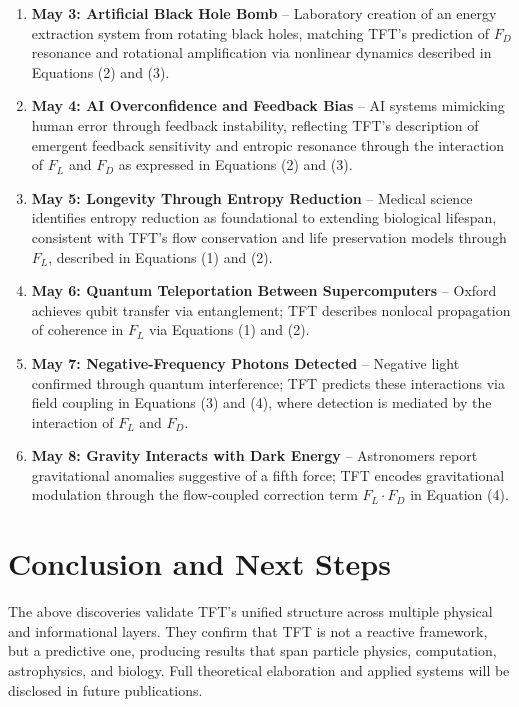 \documentclass[11pt]{article}
\begin{document}
\begin{enumerate}
\item \textbf{May 3: Artificial Black Hole Bomb} – Laboratory creation of an energy extraction system from rotating black holes, matching TFT's prediction of \(F_D\) resonance and rotational amplification via nonlinear dynamics described in Equations (2) and (3).

\item \textbf{May 4: AI Overconfidence and Feedback Bias} – AI systems mimicking human error through feedback instability, reflecting TFT's description of emergent feedback sensitivity and entropic resonance through the interaction of \(F_L\) and \(F_D\) as expressed in Equations (2) and (3).

\item \textbf{May 5: Longevity Through Entropy Reduction} – Medical science identifies entropy reduction as foundational to extending biological lifespan, consistent with TFT's flow conservation and life preservation models through \(F_L\), described in Equations (1) and (2).

\item \textbf{May 6: Quantum Teleportation Between Supercomputers} – Oxford achieves qubit transfer via entanglement; TFT describes nonlocal propagation of coherence in \(F_L\) via Equations (1) and (2).

\item \textbf{May 7: Negative-Frequency Photons Detected} – Negative light confirmed through quantum interference; TFT predicts these interactions via field coupling in Equations (3) and (4), where detection is mediated by the interaction of \(F_L\) and \(F_D\).

\item \textbf{May 8: Gravity Interacts with Dark Energy} – Astronomers report gravitational anomalies suggestive of a fifth force; TFT encodes gravitational modulation through the flow-coupled correction term \(F_L \cdot F_D\) in Equation (4).

\end{enumerate}

\section*{Conclusion and Next Steps}
The above discoveries validate TFT's unified structure across multiple physical and informational layers. They confirm that TFT is not a reactive framework, but a predictive one, producing results that span particle physics, computation, astrophysics, and biology. Full theoretical elaboration and applied systems will be disclosed in future publications.
\end{document}
